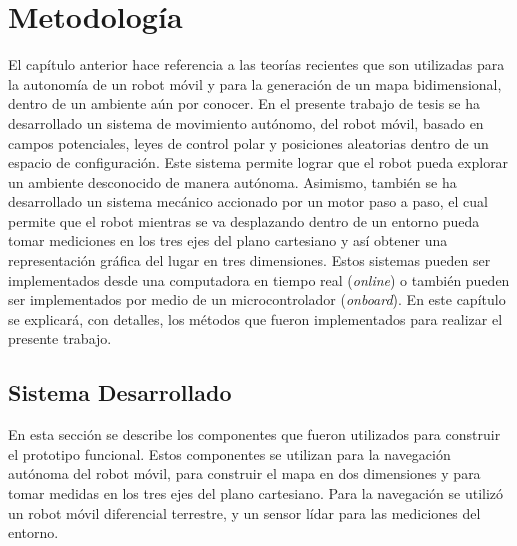 \chapter{Metodolog\'ia}

El capítulo anterior hace referencia a las teorías recientes que son
utilizadas para la autonomía de un robot móvil y para la generación de
un mapa bidimensional, dentro de un ambiente aún por conocer. En el presente
trabajo de tesis se ha desarrollado un sistema de movimiento 
autónomo, del robot móvil, basado en campos potenciales, leyes de control 
polar y posiciones aleatorias dentro de un espacio de configuración. Este sistema
permite lograr que el robot pueda explorar un ambiente desconocido de manera
autónoma. Asimismo, también se ha desarrollado un sistema mecánico accionado 
por un motor paso a paso, el cual permite que el robot mientras se va desplazando
dentro de un entorno pueda tomar mediciones en los tres ejes del plano
cartesiano y así obtener una representación gráfica del lugar en tres 
dimensiones. Estos sistemas pueden ser implementados desde una computadora en 
tiempo real (\textit{online}) o también pueden ser implementados por medio de 
un microcontrolador (\textit{onboard}). En este capítulo se explicará, con 
detalles, los métodos que fueron implementados para realizar el presente trabajo.


\section{Sistema Desarrollado}
En esta sección se describe los componentes que fueron utilizados para construir
el prototipo funcional. Estos componentes se utilizan para la navegación 
autónoma del robot móvil, para construir el mapa en dos dimensiones y para tomar medidas 
en los tres ejes del plano cartesiano. Para la navegación se utilizó un robot móvil 
diferencial terrestre, y un sensor lídar para las mediciones del entorno.

